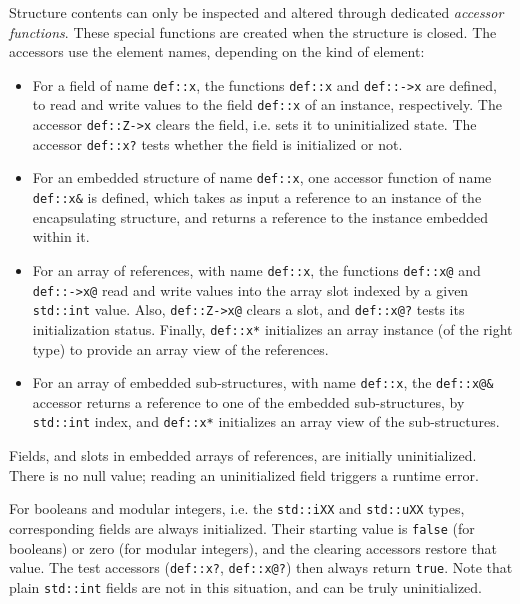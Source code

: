 Structure contents can only be inspected and altered through dedicated
\emph{accessor functions}. These special functions are created when the
structure is closed. The accessors use the element names, depending on
the kind of element:
\begin{itemize}

    \item For a field of name \verb|def::x|, the functions \verb|def::x|
    and \verb|def::->x| are defined, to read and write values to the
    field \verb|def::x| of an instance, respectively. The accessor
    \verb|def::Z->x| clears the field, i.e. sets it to uninitialized
    state. The accessor \verb|def::x?| tests whether the field is
    initialized or not.

    \item For an embedded structure of name \verb|def::x|, one accessor
    function of name \verb|def::x&| is defined, which takes as input
    a reference to an instance of the encapsulating structure, and returns
    a reference to the instance embedded within it.

    \item For an array of references, with name \verb|def::x|, the
    functions \verb|def::x@| and \verb|def::->x@| read and write values
    into the array slot indexed by a given \verb|std::int| value.
    Also, \verb|def::Z->x@| clears a slot, and \verb|def::x@?| tests
    its initialization status. Finally, \verb|def::x*| initializes an
    array instance (of the right type) to provide an array view of the
    references.

    \item For an array of embedded sub-structures, with name \verb|def::x|,
    the \verb|def::x@&| accessor returns a reference to one of the
    embedded sub-structures, by \verb|std::int| index, and \verb|def::x*|
    initializes an array view of the sub-structures.

\end{itemize}

Fields, and slots in embedded arrays of references, are initially
uninitialized. There is no null value; reading an uninitialized field
triggers a runtime error.

For booleans and modular integers, i.e. the \verb|std::iXX| and
\verb|std::uXX| types, corresponding fields are always initialized.
Their starting value is \verb|false| (for booleans) or zero (for modular
integers), and the clearing accessors restore that value. The test
accessors (\verb|def::x?|, \verb|def::x@?|) then always return
\verb|true|. Note that plain \verb|std::int| fields are not in this
situation, and can be truly uninitialized.

